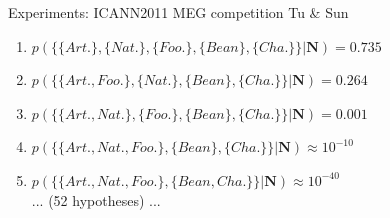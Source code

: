 \documentclass[aspectratio=169]{beamer}
\begin{document}
\begin{frame}{Experiments: ICANN2011 MEG competition}
  Tu \& Sun
\begin{enumerate}
\item \alert{$p(\{\{Art.\}, \{Nat.\}, \{Foo.\}, \{Bean\}, \{Cha.\}\} | \mathbf{N}) = 0.735$}
\item \alert{$p(\{\{Art., Foo.\}, \{Nat.\}, \{Bean\}, \{Cha.\}\} | \mathbf{N}) = 0.264$}
\item $p(\{\{Art., Nat.\}, \{Foo.\}, \{Bean\}, \{Cha.\}\} | \mathbf{N}) = 0.001$
\item $p(\{\{Art., Nat., Foo.\}, \{Bean\}, \{Cha.\}\} | \mathbf{N}) \approx 10^{-10}$
\setcounter{enumi}{12}
\item $p(\{\{Art., Nat., Foo.\}, \{Bean, Cha.\}\} | \mathbf{N}) \approx 10^{-40}$
\\... (52 hypotheses) ...
\end{enumerate}
\cite{olivetti2012testing,olivetti2020multiclass}
\end{frame}



\end{document}
